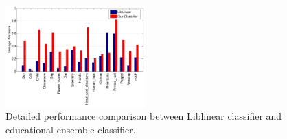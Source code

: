 \documentclass[11pt,twocolumn,twoside]{IEEEtran}
\begin{document}
\begin{figure}[h]
\includegraphics[width=0.48\textwidth]{fig6.pdf}
\centering
\caption{Detailed performance comparison between Liblinear classifier and educational ensemble classifier.} \label{fig:fig6}
\end{figure}


\end{document}
